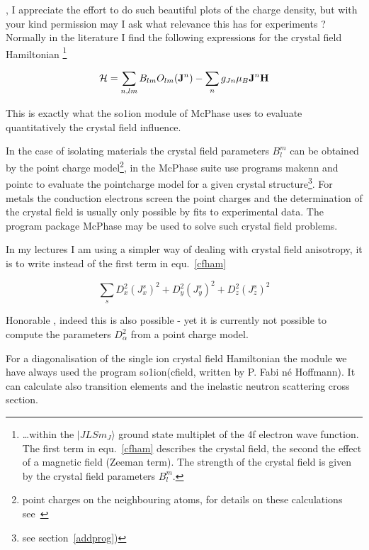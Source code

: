 \OO \ee, I appreciate the effort to do such beautiful plots of the charge density, 
but with your kind permission may I ask what relevance this has for experiments ? 
Normally in the literature I find the following expressions for the crystal field Hamiltonian
\footnote{\dots within the $|JLSm_J \rangle$ ground state multiplet of the 4f electron wave function.
The first term in equ.~\ref{cfham} describes the crystal field, the second the
effect of a magnetic field (Zeeman term). The strength of the crystal field is given by the
crystal field parameters $B_l^m$. }

\begin{equation}
\label{cfham}
 {\mathcal H}= \sum_{n,lm} B_{lm} O_{lm}({\mathbf J}^n) 
	     - \sum_{n} g_{Jn} \mu_B {\mathbf J}^n {\mathbf H} 
\end{equation}

\EE This is exactly what the {\prg so1ion} module  of {\prg McPhase}
 uses to evaluate quantitatively the crystal field influence.

 In the case of isolating materials the crystal field parameters $B_l^m$
 can be obtained by the point charge model\footnote{point charges on the 
neighbouring atoms, for details on these calculations see~\cite{hutchings64-227}},
in the {\prg McPhase} suite use programs {\prg makenn} and {\prg pointc} to evaluate
the pointcharge model for a given crystal structure\footnote{see section~\ref{addprog})}.
For metals the conduction electrons screen the point charges and the determination
of the crystal field is usually only possible by fits to experimental data. 
The program package {\prg McPhase} may be used to solve such crystal field problems.

\PP In my lectures I am using a simpler way of dealing with crystal field anisotropy,
it is to write instead of the first term in equ.~\ref{cfham}

\begin{equation}
  \sum_s D_x^2 (J_x^s)^2 + D_y^2 (J_y^s)^2 +D_z^2 (J_z^s)^2 
\end{equation}

\EE Honorable \pp, indeed this is also possible - yet it is currently not possible to
compute the parameters $D^2_{\alpha}$ from a point charge model.

\OO For a diagonalisation of the single ion crystal field Hamiltonian
the module we have always used the program {\prg so1ion}({\prg cfield}, 
written by P. Fabi n\'e Hoffmann). It can calculate also transition elements
and  the inelastic neutron scattering cross section.

